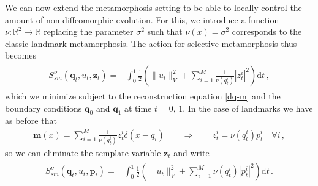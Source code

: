 \documentclass[runningheads]{llncs}
\newcommand{\half}{\frac 12}
\newcommand{\norm}[2]{\| #1 \|_{ #2 }}
\newcommand{\vnorm}[1]{\norm{ #1 }{V}}
\newcommand{\diff}[1]{\text{d} #1}
\begin{document}
We can now extend the metamorphosis setting to be able to locally control the
amount of non-diffeomorphic evolution.  For this, we introduce a function $\nu:
\mathbb R^2\to \mathbb R$ replacing the parameter $\sigma^2$ such that
$\nu(x)=\sigma^2$ corresponds to the classic landmark metamorphosis. The action 
for selective metamorphosis thus becomes 
\begin{align}
  \begin{split}
    S_{sm}^\nu(\mathbf q_t, u_t, \mathbf z_t) = & \int_0^1
    \half  \left (\vnorm{u_t}^2 +\sum_{i=1}^M \frac{1}{\nu(q_t^i)}|z_t^i|^2\right )\diff{t}\, , 
  \end{split}
  \label{E_sm-def}
\end{align}
which we minimize subject to the reconstruction equation \eqref{dq-m} and the
boundary conditions $\mathbf q_0$ and $\mathbf q_1$ at time $t=0,\,1$. In the
case of landmarks we have as before that
\begin{align}\label{zp_relation}
  \mathbf m(x) = \sum_{i=1}^M \frac{1}{\nu(q_t^i)} z_t^i\delta(x-q_i)\qquad \Rightarrow \qquad
  z_t^i = \nu(q_t^i) p_t^i\quad \forall i\, , 
\end{align}
so we can eliminate the template variable $\mathbf z_t$ and write  
\begin{align}
  \begin{split}
    S_{sm}^\nu(\mathbf q_t, u_t, \mathbf p_t) = & \int_0^1
    \half  \left (\|u_t\|_V^2  +\sum_{i=1}^M \nu(q_t^i)|p_t^i|^2\right )\diff{t}\, . 
  \end{split}
  \label{E_sm-def_p}
\end{align}
\end{document}

